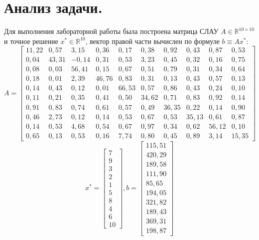 \documentclass[a4paper, 12pt]{article}
\theoremstyle{definition}
\begin{document}
	\section{Анализ задачи.}
	
	Для выполнения лабораторной работы была построена матрица СЛАУ $A\in\mathbb{R}^{10\times10}$ и точное решение $x^*\in\mathbb{R}^{10}$, вектор правой части вычислен по формуле $b\equiv Ax^*$:
	\begin{equation} \label{A_matrix}
		A=
		\begin{bmatrix}
			11,22&0,57&3,15&0,36&0,17&0,38&0,92&0,43&0,87&0,53\\
			0,04&43,31&-0,14&0,31&0,53&3,23&0,45&0,32&0,16&0,75\\
			0,08&0,03&56,41&0,15&0,67&0,51&0,79&0,31&0,34&0,64\\
			0,18&0,01&2,39&46,76&0,83&0,31&0,13&0,43&0,57&0,13\\
			0,14&0,43&0,12&0,01&66,53&0,57&0,86&0,43&0,24&0,10\\
			0,11&0,21&0,35&0,41&0,50&34,62&0,71&0,83&0,92&0,14\\
			0,91&0,83&0,74&0,61&0,57&0,49&36,35&0,22&0,14&0,90\\
			0,46&2,73&0,12&0,14&0,53&0,67&0,53&35,13&0,61&0,87\\
			0,14&0,53&4,68&0,54&0,67&0,97&0,34&0,62&56,12&0,10\\
			0,65&0,13&0,53&0,16&7,74&0,80&0,45&0,89&3,14&15,35
		\end{bmatrix}
	\end{equation}
	\begin{equation}
		\label{x_and_b}
		x^*=
		\begin{bmatrix}
			7\\ 9\\ 3\\ 2\\ 1\\ 5\\ 8\\ 4\\ 6\\ 10
		\end{bmatrix},
		b=
		\begin{bmatrix}
			115,51\\420,29\\189,58\\111,90\\85,65\\194,05\\321,82\\189,43\\369,31\\198,87
		\end{bmatrix}
	\end{equation}
\end{document}
